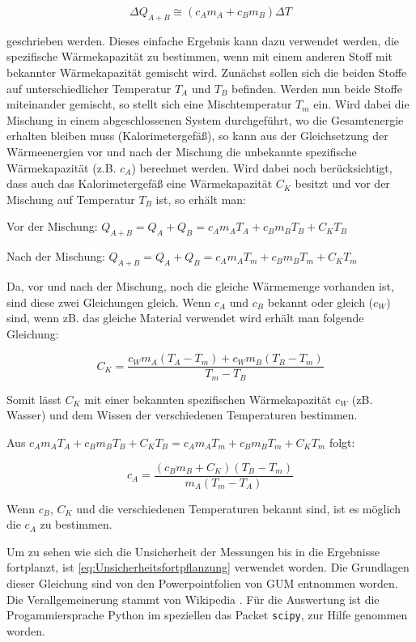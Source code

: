 \documentclass[11pt, ngerman]{scrartcl}
\begin{document}
\begin{equation}
	\Delta Q_{A+B} \cong (c_A m_A + c_B m_B) \Delta T
\end{equation}

geschrieben werden. Dieses einfache Ergebnis kann dazu verwendet werden, die
spezifische Wärmekapazität zu bestimmen, wenn mit einem anderen Stoff mit
bekannter Wärmekapazität gemischt wird. Zunächst sollen sich die beiden Stoffe
auf unterschiedlicher Temperatur $T_A$ und $T_B$ befinden. Werden nun beide Stoffe
miteinander gemischt, so stellt sich eine Mischtemperatur $T_m$ ein. Wird dabei
die Mischung in einem abgeschlossenen System durchgeführt, wo die Gesamtenergie
erhalten bleiben muss (Kalorimetergefäß), so kann aus der Gleichsetzung der
Wärmeenergien vor und nach der Mischung die unbekannte spezifische
Wärmekapazität (z.B. $c_A$) berechnet werden. Wird dabei noch berücksichtigt, dass
auch das Kalorimetergefäß eine Wärmekapazität $C_K$ besitzt und vor der Mischung
auf Temperatur $T_B$ ist, so erhält man:

Vor der Mischung: $Q_{A+B} = Q_A + Q_B =  c_A m_A T_A + c_B m_B T_B + C_K T_B$

Nach der Mischung: $Q_{A+B} = Q_A + Q_B = c_A m_A T_m + c_B m_B T_m + C_K T_m$

Da, vor und nach der Mischung, noch die gleiche Wärmemenge vorhanden ist, sind
diese zwei Gleichungen gleich.  Wenn $c_A$ und $c_B$ bekannt oder gleich ($c_W$)
sind, wenn zB. das gleiche Material verwendet wird erhält man folgende Gleichung:

\begin{equation}
	C_K = \frac{c_W m_A (T_A-T_m) + c_W m_B (T_B-T_m)}{T_m-T_B} \label{eq:warmegefaes}
\end{equation}

Somit lässt $C_K$ mit einer bekannten spezifischen Wärmekapazität $c_W$ (zB.
Wasser) und dem Wissen der verschiedenen Temperaturen bestimmen.

Aus $c_A m_A T_A + c_B m_B T_B + C_K T_B = c_A m_A T_m + c_B m_B T_m + C_K T_m$
folgt:

\begin{equation}
	c_A = \frac{(c_B m_B + C_K) (T_B - T_m)}{m_A (T_m - T_A)} \label{eq:warmestoff}
\end{equation}

Wenn $c_B$, $C_K$ und die verschiedenen Temperaturen bekannt sind,
ist es möglich die $c_A$ zu bestimmen.

Um zu sehen wie sich die Unsicherheit der Messungen bis in die Ergebnisse
fortplanzt, ist \autoref{eq:Unsicherheitsfortpflanzung} verwendet worden.
Die Grundlagen dieser Gleichung sind von den Powerpointfolien von
GUM entnommen worden.\cite{WolfgangKessel2004} Die Verallgemeinerung stammt von Wikipedia \cite{2020Fehler}.
Für die Auswertung ist die Progammiersprache Python im speziellen das
Packet \verb#scipy#, zur Hilfe genommen worden.
\end{document}

